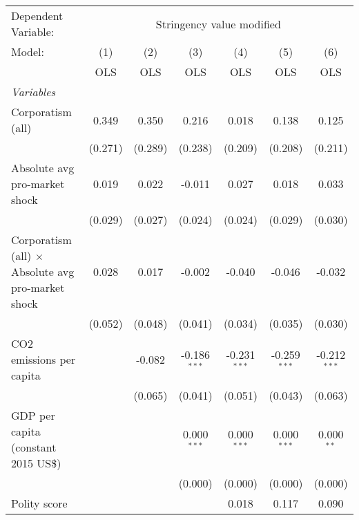 
\begingroup
\centering
\begin{tabular}{lcccccc}
   \toprule
   Dependent Variable: & \multicolumn{6}{c}{Stringency value modified}\\
   Model:                                                    & (1)     & (2)     & (3)            & (4)            & (5)            & (6)\\  
                                                             &  OLS    & OLS     & OLS            & OLS            & OLS            & OLS\\  
   \midrule
   \emph{Variables}\\
   Corporatism (all)                                         & 0.349   & 0.350   & 0.216          & 0.018          & 0.138          & 0.125\\   
                                                             & (0.271) & (0.289) & (0.238)        & (0.209)        & (0.208)        & (0.211)\\   
   Absolute avg pro-market shock                             & 0.019   & 0.022   & -0.011         & 0.027          & 0.018          & 0.033\\   
                                                             & (0.029) & (0.027) & (0.024)        & (0.024)        & (0.029)        & (0.030)\\   
   Corporatism (all) $\times$ Absolute avg pro-market shock  & 0.028   & 0.017   & -0.002         & -0.040         & -0.046         & -0.032\\   
                                                             & (0.052) & (0.048) & (0.041)        & (0.034)        & (0.035)        & (0.030)\\   
   CO2 emissions per capita                                  &         & -0.082  & -0.186$^{***}$ & -0.231$^{***}$ & -0.259$^{***}$ & -0.212$^{***}$\\   
                                                             &         & (0.065) & (0.041)        & (0.051)        & (0.043)        & (0.063)\\   
   GDP per capita (constant 2015 US\$)                       &         &         & 0.000$^{***}$  & 0.000$^{***}$  & 0.000$^{***}$  & 0.000$^{**}$\\   
                                                             &         &         & (0.000)        & (0.000)        & (0.000)        & (0.000)\\   
   Polity score                                              &         &         &                & 0.018          & 0.117          & 0.090\\   

\end{tabular}
